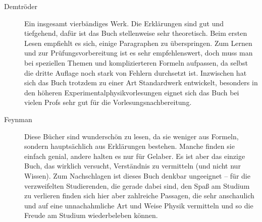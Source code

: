 \begin{description}




\item[Demtröder]{
Ein insgesamt vierbändiges Werk. Die Erklärungen sind gut und
tiefgehend, dafür ist das Buch stellenweise sehr theoretisch. Beim
ersten
Lesen empfiehlt es sich, einige Paragraphen zu überspringen. Zum Lernen
und zur Prüfungsvorbereitung ist es sehr empfehlenswert, doch muss
man bei
speziellen Themen und komplizierteren Formeln aufpassen, da selbst die
dritte
Auflage noch stark von Fehlern durchsetzt ist. Inzwischen hat sich das
Buch
trotzdem zu einer Art Standardwerk entwickelt, besonders in den höheren
Experimentalphysikvorlesungen eignet sich das Buch bei vielen Profs
sehr gut
für die Vorlesungsnachbereitung.}

\item[Feynman]{
Diese Bücher sind wunderschön zu lesen, da sie weniger aus Formeln,
sondern
hauptsächlich aus Erklärungen bestehen. Manche finden sie einfach
genial,
andere halten es nur für Gelaber. Es ist aber das einzige Buch, das
wirklich versucht,
Verständnis zu vermitteln (und nicht nur Wissen). Zum Nachschlagen
ist dieses Buch
denkbar ungeeignet -- für die verzweifelten Studierenden, die gerade dabei
sind, den Spaß
am Studium zu verlieren finden sich hier aber zahlreiche Passagen, die
sehr anschaulich
und auf eine unnachahmliche Art und Weise Physik vermitteln und so die
Freude am
Studium wiederbeleben können.}


\end{description}
